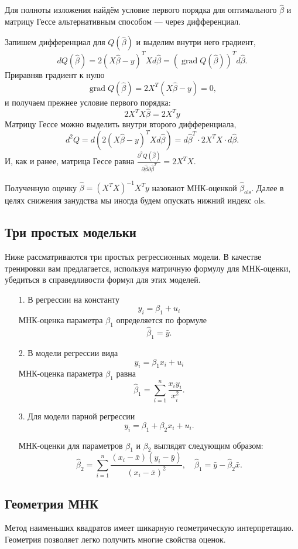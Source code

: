 \documentclass[12pt]{article}
\DeclareMathOperator{\grad}{grad}
\newcommand{\hb}{\hat{\beta}}
\newcommand{\ols}{\text{ols}}
\begin{document}
Для полноты изложения найдём условие первого порядка для оптимального $\hb$ и матрицу Гессе альтернативным способом — через дифференциал.

Запишем дифференциал для $Q(\hb)$ и выделим внутри него градиент,
\[
dQ(\hb) = 2(X\hb - y)^TX d\hb = (\grad Q(\hb))^T d\hb.
\]
Приравняв градиент к нулю
\[
\grad Q(\hb) =  2X^T(X\hb - y) = 0,
\]
и получаем прежнее условие первого порядка:
\[
2X^TX\hb = 2X^{T}y
\]
Матрицу Гессе можно выделить внутри второго дифференциала,
\[
d^2 Q = d(2(X\hb - y)^TX d\hb) = d\hb^T \cdot 2X^T X \cdot d\hb. 
\]
И, как и ранее, матрица Гессе равна $\frac{\partial^2 Q(\hb)}{\partial \hb \partial \hb^T} = 2X^TX$.

Полученную оценку $\hb = (X^TX)^{-1}X^Ty$ назовают МНК-оценкой $\hb_{\ols}$. 
Далее в целях снижения занудства мы иногда будем опускать нижний индекс $\ols$.


\subsection{Три простых модельки}
Ниже рассматриваются три простых регрессионных модели. В качестве тренировки вам предлагается, используя матричную формулу для МНК-оценки, убедиться в справедливости формул для этих моделей.
\begin{enumerate}
    \item[1.] В регрессии на константу
\[
y_i = \beta_1 + u_i
\]
МНК-оценка параметра $\beta_1$ определяется по формуле
\[
\hb_1 = \bar{y}.
\]

\item[2.] В модели регрессии вида
\[
y_i = \beta_1 x_i + u_i
\]
МНК-оценка параметра $\beta_1$ равна
\[
\hb_1 = \sum_{i=1}^n \frac{x_i y_i}{x_i^2}.
\]

\item[3.] Для модели парной регрессии 
\[
y_i = \beta_1 + \beta_2 x_i + u_i.
\]

МНК-оценки для параметров $\beta_1$ и $\beta_2$ выглядят следующим образом:
\[
\hb_2 = \sum_{i=1}^n \frac{(x_i - \bar{x})(y_i - \bar{y})}{(x_i - \bar{x})^2}, \quad \hb_1 = \bar{y} - \hb_2 \bar{x}.
\]

\end{enumerate}


\subsection{Геометрия МНК}

Метод наименьших квадратов имеет шикарную геометрическую интерпретацию.
Геометрия позволяет легко получить многие свойства оценок. 
\end{document}
